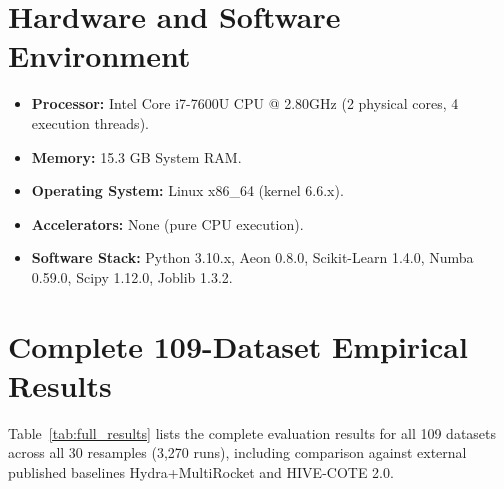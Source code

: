 \documentclass[journal,onecolumn]{article}
\begin{document}
\section{Hardware and Software Environment}
\begin{itemize}
    \item \textbf{Processor:} Intel Core i7-7600U CPU @ 2.80GHz (2 physical cores, 4 execution threads).
    \item \textbf{Memory:} 15.3 GB System RAM.
    \item \textbf{Operating System:} Linux x86\_64 (kernel 6.6.x).
    \item \textbf{Accelerators:} None (pure CPU execution).
    \item \textbf{Software Stack:} Python 3.10.x, Aeon 0.8.0, Scikit-Learn 1.4.0, Numba 0.59.0, Scipy 1.12.0, Joblib 1.3.2.
\end{itemize}

\section{Complete 109-Dataset Empirical Results}
Table~\ref{tab:full_results} lists the complete evaluation results for all 109 datasets across all 30 resamples (3,270 runs), including comparison against external published baselines Hydra+MultiRocket and HIVE-COTE 2.0.


\end{document}

